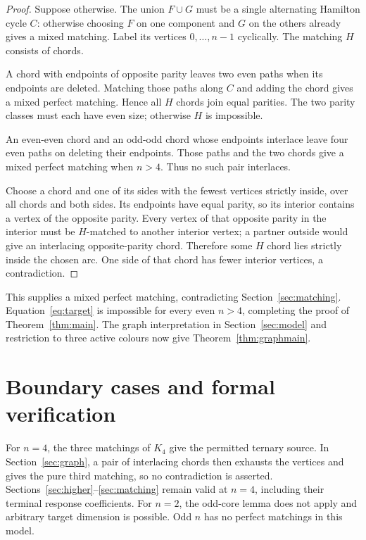 \documentclass[11pt]{article}
\theoremstyle{definition}
\theoremstyle{plain}
\numberwithin{equation}{section}
\begin{document}
\begin{proof}
Suppose otherwise. The union \(F\cup G\) must be a single alternating
Hamilton cycle \(C\): otherwise choosing \(F\) on one component and \(G\)
on the others already gives a mixed matching. Label its vertices
\(0,\ldots,n-1\) cyclically. The matching \(H\) consists of chords.

A chord with endpoints of opposite parity leaves two even paths when its
endpoints are deleted. Matching those paths along \(C\) and adding the chord
gives a mixed perfect matching. Hence all \(H\) chords join equal parities.
The two parity classes must each have even size; otherwise \(H\) is impossible.

An even-even chord and an odd-odd chord whose endpoints interlace leave four
even paths on deleting their endpoints. Those paths and the two chords give
a mixed perfect matching when \(n>4\). Thus no such pair interlaces.

Choose a chord and one of its sides with the fewest vertices strictly inside,
over all chords and both sides. Its endpoints have equal parity, so its
interior contains a vertex of the opposite parity. Every vertex of that
opposite parity in the interior must be \(H\)-matched to another interior
vertex; a partner outside would give an interlacing opposite-parity chord.
Therefore some \(H\) chord lies strictly inside the chosen arc. One side of
that chord has fewer interior vertices, a contradiction.
\end{proof}

This supplies a mixed perfect matching, contradicting Section~\ref{sec:matching}.
Equation~\eqref{eq:target} is impossible for every even \(n>4\), completing
the proof of Theorem~\ref{thm:main}. The graph interpretation in
Section~\ref{sec:model} and restriction to three active colours now give
Theorem~\ref{thm:graphmain}.

\section{Boundary cases and formal verification}\label{sec:scope}

For \(n=4\), the three matchings of \(K_4\) give the permitted ternary
source. In Section~\ref{sec:graph}, a pair of interlacing chords then exhausts
the vertices and gives the pure third matching, so no contradiction is asserted.
Sections~\ref{sec:higher}--\ref{sec:matching} remain valid at \(n=4\), including
their terminal response coefficients. For \(n=2\), the odd-core lemma does not
apply and arbitrary target dimension is possible. Odd \(n\) has no perfect
matchings in this model.
\end{document}
